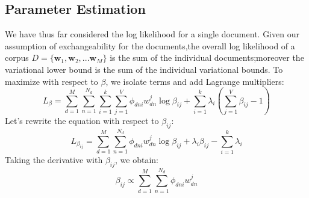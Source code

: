 \documentclass[12pt,a4paper]{article}
\begin{document}
\begin{CJK}{UTF8}{gbsn}
\section{Parameter Estimation}
We have thus far considered the log likelihood for a single document. Given our assumption of exchangeability for the documents,the overall log likelihood of a corpus $D = \{\bm{w}_1,\bm{w}_2,...\bm{w}_M\}$ is the sum of the individual documents;moreover the variational lower bound is the sum of the individual variational bounds. To maximize with respect to $\beta$, we isolate terms and add Lagrange multipliers:
$$L_{\beta} = \sum_{d=1}^M\sum_{n=1}^{N_{d}}\sum_{i=1}^k\sum_{j=1}^V\phi_{dni}w_{dn}^j\log \beta_{ij} + \sum_{i=1}^k\lambda_i(\sum_{j=1}^V\beta_{ij}-1)$$Let's rewrite the equation with respect to $\beta_{ij}$:
$$L_{\beta_{ij}} = \sum_{d=1}^M\sum_{n=1}^{N_{d}}\phi_{dni}w_{dn}^j\log \beta_{ij} + \lambda_i\beta_{ij} - \sum_{i=1}^k\lambda_i$$Taking the derivative with $\beta_{ij}$, we obtain:
$$\beta_{ij}\varpropto \sum_{d=1}^M\sum_{n=1}^{N_{d}}\phi_{dni}w_{dn}^j$$

\end{CJK}
\end{document}
